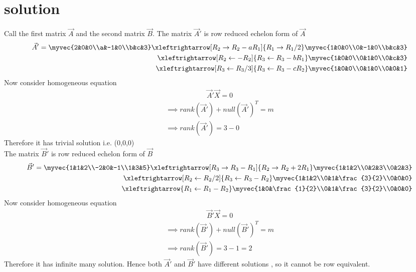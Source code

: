 \documentclass[journal,12pt,twocolumn]{IEEEtran}
\begin{document}
 \section{solution}
 Call the first matrix $\vec{A}$ and the second matrix $\vec{B}$. The matrix $\vec{A}{'}$ is  row reduced echelon form of $\vec{A}$  
 \begin{align}
     \vec{A}{'}=\myvec{2&0&0\\a&-1&0\\b&c&3}
     \xleftrightarrow[R_2\rightarrow R_2-aR_1]{R_1\rightarrow R_1/2}\myvec{1&0&0\\0&-1&0\\b&c&3}\\
     \xleftrightarrow[R_2\leftarrow-R_2]{R_3\leftarrow R_3-bR_1}
     \myvec{1&0&0\\0&1&0\\0&c&3}\\
     \xleftrightarrow[R_3\leftarrow R_3/3]{R_3\leftarrow R_3-cR_2}\myvec{1&0&0\\0&1&0\\0&0&1}
 \end{align}
 Now consider homogeneous equation 
 \begin{align}
   \vec{A}{'}\vec{X}=0
   \end{align}
   \begin{align}
   \implies rank(\vec{A}{'})+null(\vec{A}{'})^{T}=m\\
   \implies rank(\vec{A}{'}) = 3-0
   \end{align}
   Therefore it has trivial solution i.e. (0,0,0)\\
   The matrix $\vec{B}{'}$ is row reduced echelon form of $\vec{B}$  
    \begin{align}
     \vec{B}{'}=\myvec{1&1&2\\-2&0&-1\\1&3&5}
     \xleftrightarrow[R_3\rightarrow R_3-R_1]{R_2\rightarrow R_2+2R_1}\myvec{1&1&2\\0&2&3\\0&2&3}\\
     \xleftrightarrow[R_2\leftarrow R_2/2]{R_3\leftarrow R_3-R_2}
     \myvec{1&1&2\\0&1&\frac{3}{2}\\0&0&0}\\
     \xleftrightarrow{R_1\leftarrow R_1-R_2} \myvec{1&0&\frac{1}{2}\\0&1&\frac{3}{2}\\0&0&0}
 \end{align}
  Now consider homogeneous equation 
 \begin{align}
   \vec{B}{'}\vec{X}=0
   \end{align}
   \begin{align}
   \implies rank(\vec{B}{'})+null(\vec{B}{'})^{T}=m\\
   \implies rank(\vec{B}{'}) = 3-1 = 2
   \end{align}
   Therefore it has infinite many solution.
   Hence both $\vec{A}{'}$ and $\vec{B}{'}$ have different solutions , so it cannot be row equivalent.  
 
\end{document}

